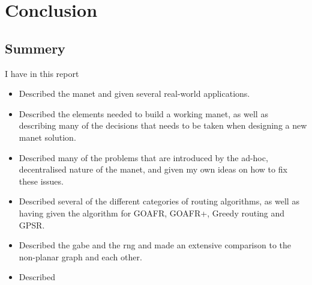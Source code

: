 
\section{Conclusion}
\label{section:conclusion}

\subsection{Summery}
I have in this report

\begin{itemize}
\item Described the \ac{manet} and given several real-world applications.
\item Described the elements needed to build a working \ac{manet}, as well as describing many of the decisions that needs to be taken when designing a new \ac{manet} solution.
\item Described many of the problems that are introduced by the ad-hoc, decentralised nature of the \ac{manet}, and given my own ideas on how to fix these issues.
\item Described several of the different categories of routing algorithms, as well as having given the algorithm for GOAFR, GOAFR+, Greedy routing and GPSR.
\item Described the \ac{gabe} and the \ac{rng} and made an extensive comparison to the non-planar graph and each other.
\item Described 
\end{itemize}

